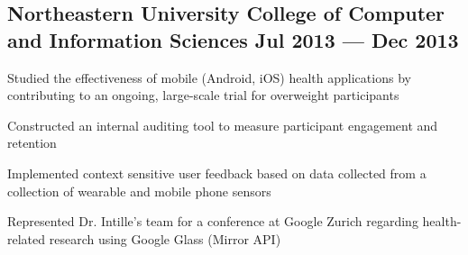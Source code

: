 
\subsection{{Northeastern University College of Computer and Information Sciences \hfill Jul 2013 --- Dec 2013}}
\begin{zitemize}
\item Studied the effectiveness of mobile (Android, iOS) health applications by contributing to an ongoing, large-scale trial for overweight participants
\item Constructed an internal auditing tool to measure participant engagement and retention
\item Implemented context sensitive user feedback based on data collected from a collection of wearable and mobile phone sensors
\item Represented Dr. Intille's team for a conference at Google Zurich regarding health-related research using Google Glass (Mirror API)
\end{zitemize}
